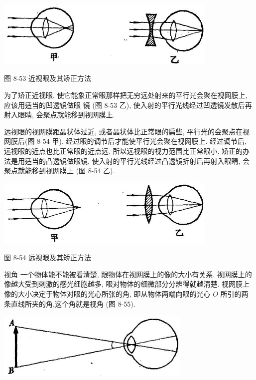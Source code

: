 \documentclass[10pt]{article}
\begin{document}
\begin{center}
\includegraphics[max width=0.8\textwidth]{images/01913056-1f15-74d8-9184-9aab52c9d66b_287_573380.jpg}
\end{center}

图 8-53 近视眼及其矫正方法

为了矫正近视眼, 使它能象正常眼那样把无穷远处射来的平行光会聚在视网膜上, 应该用适当的凹透镜做眼 镜 (图 8-53 乙), 使入射的平行光线经过凹透镜发散后再射入眼睛, 会聚点就能移到视网膜上.

远视眼的视网膜距晶状体过近, 或者晶状体比正常眼的扁些, 平行光的会聚点在视网膜后(图 8-54 甲). 经过眼的调节后才能使平行光会聚在视网膜上. 经过调节后, 远视眼的近点也比正常眼的近点远. 所以远视眼的视力范围比正常眼小. 矫正的办法是用适当的凸透镜做眼镜, 使入射的平行光线经过凸透镜折射后再射入眼睛, 会聚点就能移到视网膜上 (图 8-54 乙).

\begin{center}
\includegraphics[max width=0.8\textwidth]{images/01913056-1f15-74d8-9184-9aab52c9d66b_288_381033.jpg}
\end{center}

图 8-54 远视眼及其矫正方法

视角 一个物体能不能被看清楚, 跟物体在视网膜上的像的大小有关系. 视网膜上的像越大受到刺激的感光细胞越多, 眼对物体的细微部分分辨得就越清楚. 视网膜上像的大小决定于物体对眼的光心所张的角, 即从物体两端向眼的光心 \(O\) 所引的两条直线所夹的角,这个角就是视角 (图 8-55).

\begin{center}
\includegraphics[max width=0.7\textwidth]{images/01913056-1f15-74d8-9184-9aab52c9d66b_288_706374.jpg}
\end{center}
\end{document}

